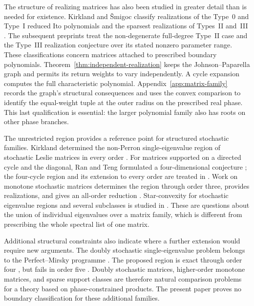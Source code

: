 \documentclass[11pt,a4paper]{article}
\theoremstyle{definition}
\theoremstyle{remark}
\numberwithin{equation}{section}
\begin{document}
The structure of realizing matrices has also been studied in greater detail than is needed for existence. Kirkland and \v{S}migoc classify realizations of the Type~0 and Type~I reduced Ito polynomials and the sparsest realizations of Types~II and~III \cite{KirklandSmigoc}. The subsequent preprints \cite{VGTypeII,VGTypeIII} treat the non-degenerate full-degree Type~II case and the Type~III realization conjecture over its stated nonzero parameter range. These classifications concern matrices attached to prescribed boundary polynomials. Theorem~\ref{thm:independent-realization} keeps the Johnson--Paparella graph and permits its return weights to vary independently. A cycle expansion computes the full characteristic polynomial. Appendix~\ref{app:matrix-family} records the graph's structural consequences and uses the convex comparison to identify the equal-weight tuple at the outer radius on the prescribed real phase. This last qualification is essential: the larger polynomial family also has roots on other phase branches.

The unrestricted region provides a reference point for structured stochastic families. Kirkland determined the non-Perron single-eigenvalue region of stochastic Leslie matrices in every order \cite{KirklandLeslie}. For matrices supported on a directed cycle and the diagonal, Ran and Teng formulated a four-dimensional conjecture \cite[Conjecture~20]{RanTeng}; the four-cycle region and its extension to every order are treated in \cite{VagenendeFourCycle,VGNCycle}. Work on monotone stochastic matrices determines the region through order three, provides realizations, and gives an all-order reduction \cite{VagenendeMonotone}. Star-convexity for stochastic eigenvalue regions and several subclasses is studied in \cite{VagenendeStar}. These are questions about the union of individual eigenvalues over a matrix family, which is different from prescribing the whole spectral list of one matrix.

Additional structural constraints also indicate where a further extension would require new arguments. The doubly stochastic single-eigenvalue problem belongs to the Perfect--Mirsky programme \cite{PerfectMirsky}. The proposed region is exact through order four \cite{LevickPereiraKribs}, but fails in order five \cite{HarlevJohnsonLim}. Doubly stochastic matrices, higher-order monotone matrices, and sparse support classes are therefore natural comparison problems for a theory based on phase-constrained products. The present paper proves no boundary classification for these additional families.
\end{document}
